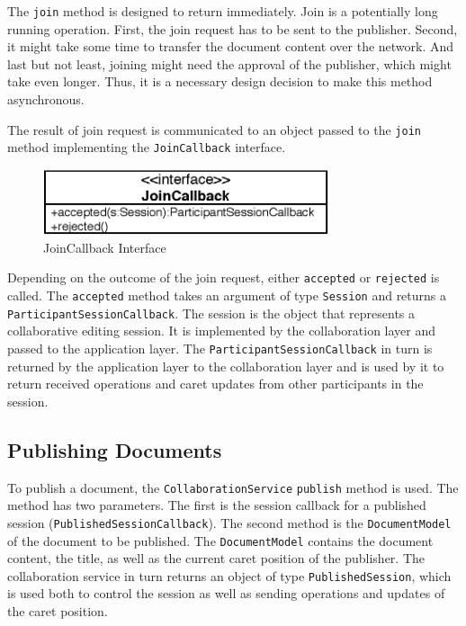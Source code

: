 The \texttt{join} method is designed to return immediately. Join is a 
potentially long running operation. First, the join request has to be sent
to the publisher. Second, it might take some time to transfer the document
content over the network. And last but not least, joining might need the 
approval of the publisher, which might take even longer. Thus, it is a 
necessary design decision to make this method asynchronous.

The result of join request is communicated to an object passed to the
\texttt{join} method implementing the \texttt{Join\-Callback} interface.

\begin{figure}[H]
 \centering
 \includegraphics[width=8.43cm,height=1.94cm]{../images/finalreport/architecture_joincallback_uml.eps}
 \caption{JoinCallback Interface}
\end{figure}

Depending on the outcome of the join request, either \texttt{accepted} or
\texttt{rejected} is called. The \texttt{accepted} method takes an argument
of type \texttt{Session} and returns a \texttt{Participant\-Session\-Callback}. 
The session
is the object that represents a collaborative editing session. It is
implemented by the collaboration layer and passed to the application layer.
The \texttt{Participant\-Session\-Callback} in turn is returned by the 
application layer to the collaboration layer and is used by it to return 
received operations and caret updates from other participants in the session.


\subsection{Publishing Documents}
To publish a document, the \texttt{Collaboration\-Service} \texttt{publish}
method is used. The method has two parameters. The first is the session callback
for a published session (\texttt{Published\-Session\-Callback}). 
The second method is the \texttt{Document\-Model}
of the document to be published. The \texttt{Document\-Model} contains the
document content, the title, as well as the current caret position of the
publisher. The collaboration service in turn returns an object of type
\texttt{Published\-Session}, which is used both to control the session as well
as sending operations and updates of the caret position.


